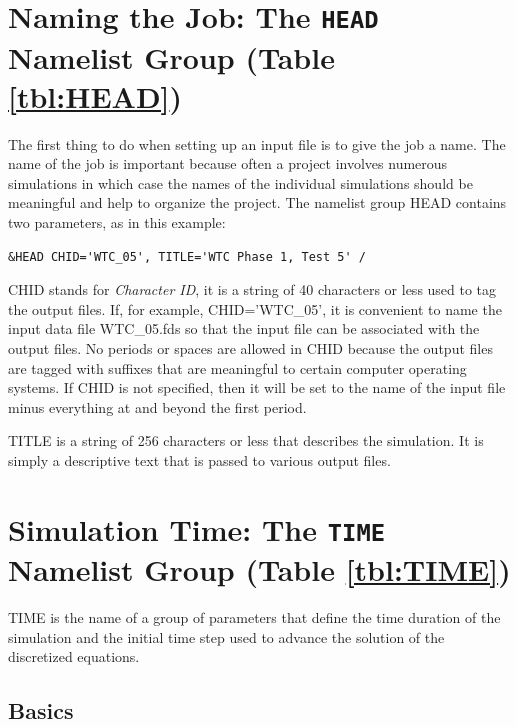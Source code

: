 \documentclass[11pt]{book}
\begin{document}
\section{Naming the Job: The \texorpdfstring{{\tt HEAD}}{HEAD} Namelist Group (Table \ref{tbl:HEAD})}
\label{info:HEAD}

The first thing to do when setting up an input file is to give the
job a name.  The name of the job is important because often a project
involves numerous simulations in which case the names of the individual
simulations should be meaningful and help to organize the project.  The namelist group {\ct HEAD} contains
two parameters, as in this example:
\begin{lstlisting}
&HEAD CHID='WTC_05', TITLE='WTC Phase 1, Test 5' /
\end{lstlisting}
\begin{description}
\item {\ct CHID} stands for \emph{Character ID}, it is a string of 40 characters or less used to tag the output files. If, for example, {\ct CHID='WTC\_05'}, it is convenient to name the input data file {\ct WTC\_05.fds} so that the input file can be associated with the output files. No periods or spaces are allowed in {\ct CHID} because the output files are tagged with suffixes that are meaningful to certain computer operating systems.  If {\ct CHID} is not specified, then it will be set to the name of the input file minus everything at and beyond the first period.
\item {\ct TITLE} is a string of 256 characters or less that describes the simulation. It is simply a descriptive text that is passed to various output files.
\end{description}


\section{Simulation Time: The \texorpdfstring{{\tt TIME}}{TIME} Namelist Group (Table \ref{tbl:TIME})}
\label{info:TIME}

{\ct TIME} is the name of a group of parameters that define the time
duration of the simulation and the initial time step used to advance
the solution of the discretized equations.

\subsection{Basics}
\label{info:TIME_Basics}
\end{document}
